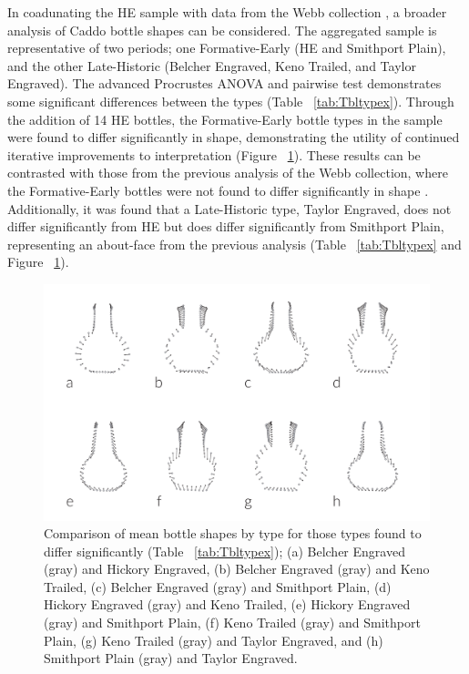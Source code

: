 \documentclass[review]{elsarticle}
\begin{document}
In coadunating the HE sample with data from the Webb collection \citep{RN11716}, a broader analysis of Caddo bottle shapes can be considered. The aggregated sample is representative of two periods; one Formative-Early (HE and Smithport Plain), and the other Late-Historic (Belcher Engraved, Keno Trailed, and Taylor Engraved). The advanced Procrustes ANOVA and pairwise test demonstrates some significant differences between the types (Table ~\ref{tab:Tbltypex}). Through the addition of 14 HE bottles, the Formative-Early bottle types in the sample were found to differ significantly in shape, demonstrating the utility of continued iterative improvements to interpretation (Figure ~\ref{fig:comptype}). These results can be contrasted with those from the previous analysis of the Webb collection, where the Formative-Early bottles were not found to differ significantly in shape \citep[Table 5]{RN11716}. Additionally, it was found that a Late-Historic type, Taylor Engraved, does not differ significantly from HE but does differ significantly from Smithport Plain, representing an about-face from the previous analysis \citep[Table 5]{RN11716} (Table ~\ref{tab:Tbltypex} and Figure ~\ref{fig:comptype}).

\begin{figure}[ht]\centering
\includegraphics[width=\linewidth]{FigCompType.pdf}
\caption{Comparison of mean bottle shapes by type for those types found to differ significantly (Table ~\ref{tab:Tbltypex}); (a) Belcher Engraved (gray) and Hickory Engraved, (b) Belcher Engraved (gray) and Keno Trailed, (c) Belcher Engraved (gray) and Smithport Plain, (d) Hickory Engraved (gray) and Keno Trailed, (e) Hickory Engraved (gray) and Smithport Plain, (f) Keno Trailed (gray) and Smithport Plain, (g) Keno Trailed (gray) and Taylor Engraved, and (h) Smithport Plain (gray) and Taylor Engraved.}
\label{fig:comptype}
\end{figure}
\end{document}
